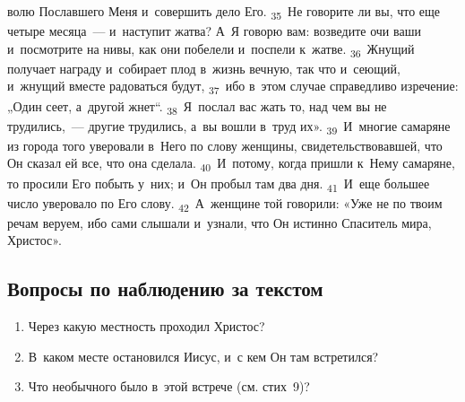 \documentclass[a4paper,12pt]{article}
\begin{document}
волю Пославшего Меня и~совершить дело Его. \textsubscript{35}~Не говорите ли вы, что еще четыре месяца~--- и~наступит жатва? А~Я говорю вам: возведите очи ваши и~посмотрите на нивы, как они побелели и~поспели к~жатве. \textsubscript{36}~Жнущий получает награду и~собирает плод в~жизнь вечную, так что и~сеющий, и~жнущий вместе радоваться будут, \textsubscript{37}~ибо в~этом случае справедливо изречение: „Один сеет, а~другой жнет“. \textsubscript{38}~Я~послал вас жать то, над чем вы не трудились,~--- другие трудились, а~вы вошли в~труд их». \textsubscript{39}~И~многие самаряне из города того уверовали в~Него по слову женщины, свидетельствовавшей, что Он сказал ей все, что она сделала. \textsubscript{40}~И~потому, когда пришли к~Нему самаряне, то просили Его побыть у~них; и~Он пробыл там два дня. \textsubscript{41}~И~еще большее число уверовало по Его слову. \textsubscript{42}~А~женщине той говорили: «Уже не по твоим речам веруем, ибо сами слышали и~узнали, что Он истинно Спаситель мира, Христос». 


\subsection*{Вопросы по наблюдению за текстом}
\begin{enumerate}
    \item Через какую местность проходил Христос? 
    
    \myline
    
    \item В~каком месте остановился Иисус, и~с кем Он там встретился? 
    
    \myline
    
    \myline
    \item Что необычного было в~этой встрече (см. стих~9)? 
    
    \myline
    
    \myline
\end{enumerate}
\end{document}
